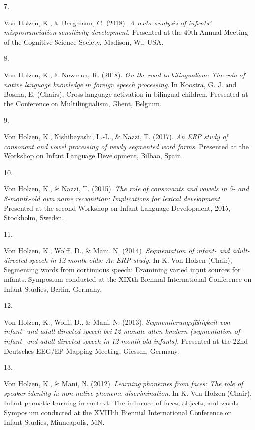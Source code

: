 \documentclass[10pt,a4paper,]{article}
\newlength{\cslhangindent}
\newlength{\csllabelwidth}
\newcommand{\CSLLeftMargin}[1]{\parbox[t]{\csllabelwidth}{\hfill #1~}}
\newcommand{\CSLRightInline}[1]{\parbox[t]{\linewidth - \cslhangindent - \csllabelwidth}{#1}\vspace{0.8ex}}
\begin{document}
\leavevmode{}%
\CSLLeftMargin{7. }%
\CSLRightInline{Von Holzen, K., \& Bergmann, C. (2018). \emph{A
meta-analysis of infants' mispronunciation sensitivity development}.
Presented at the 40th Annual Meeting of the Cognitive Science Society,
Madison, WI, USA.}

\leavevmode{}%
\CSLLeftMargin{8. }%
\CSLRightInline{Von Holzen, K., \& Newman, R. (2018). \emph{On the road
to bilingualism: The role of native language knowledge in foreign speech
processing}. In Koostra, G. J. and Bosma, E. (Chairs), Cross-language
activation in bilingual children. Presented at the Conference on
Multilingualism, Ghent, Belgium.}

\leavevmode{}%
\CSLLeftMargin{9. }%
\CSLRightInline{Von Holzen, K., Nishibayashi, L.-L., \& Nazzi, T.
(2017). \emph{An ERP study of consonant and vowel processing of newly
segmented word forms.} Presented at the Workshop on Infant Language
Development, Bilbao, Spain.}

\leavevmode{}%
\CSLLeftMargin{10. }%
\CSLRightInline{Von Holzen, K., \& Nazzi, T. (2015). \emph{The role of
consonants and vowels in 5- and 8-month-old own name recognition:
Implications for lexical development}. Presented at the second Workshop
on Infant Language Development, 2015, Stockholm, Sweden.}

\leavevmode{}%
\CSLLeftMargin{11. }%
\CSLRightInline{Von Holzen, K., Wolff, D., \& Mani, N. (2014).
\emph{Segmentation of infant- and adult-directed speech in
12-month-olds: An ERP study}. In K. Von Holzen (Chair), Segmenting words
from continuous speech: Examining varied input sources for infants.
Symposium conducted at the XIXth Biennial International Conference on
Infant Studies, Berlin, Germany.}

\leavevmode{}%
\CSLLeftMargin{12. }%
\CSLRightInline{Von Holzen, K., Wolff, D., \& Mani, N. (2013).
\emph{Segmentierungsfähigkeit von infant- und adult-directed speech bei
12 monate alten kindern (segmentation of infant- and adult-directed
speech in 12-month-old infants)}. Presented at the 22nd Deutsches EEG/EP
Mapping Meeting, Giessen, Germany.}

\leavevmode{}%
\CSLLeftMargin{13. }%
\CSLRightInline{Von Holzen, K., \& Mani, N. (2012). \emph{Learning
phonemes from faces: The role of speaker identity in non-native phoneme
discrimination}. In K. Von Holzen (Chair), Infant phonetic learning in
context: The influence of faces, objects, and words. Symposium conducted
at the XVIIIth Biennial International Conference on Infant Studies,
Minneapolis, MN.}
\end{document}
